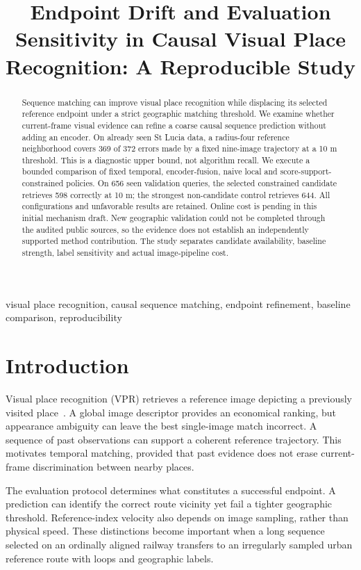 \documentclass[conference]{IEEEtran}
\title{Endpoint Drift and Evaluation Sensitivity in Causal Visual Place Recognition: A Reproducible Study}
\author{\IEEEauthorblockN{Mingyang Zhou}\IEEEauthorblockA{University of Chinese Academy of Sciences\\\textit{Additional authors and correspondence pending}}}
\begin{document}
\maketitle
\begin{abstract}
Sequence matching can improve visual place recognition while displacing its selected reference endpoint under a strict geographic matching threshold. We examine whether current-frame visual evidence can refine a coarse causal sequence prediction without adding an encoder. On already seen St Lucia data, a radius-four reference neighborhood covers 369 of 372 errors made by a fixed nine-image trajectory at a 10 m threshold. This is a diagnostic upper bound, not algorithm recall. We execute a bounded comparison of fixed temporal, encoder-fusion, naive local and score-support-constrained policies. On 656 seen validation queries, the selected constrained candidate retrieves 598 correctly at 10 m; the strongest non-candidate control retrieves 644. All configurations and unfavorable results are retained. Online cost is pending in this initial mechanism draft. New geographic validation could not be completed through the audited public sources, so the evidence does not establish an independently supported method contribution. The study separates candidate availability, baseline strength, label sensitivity and actual image-pipeline cost.
\end{abstract}
\begin{IEEEkeywords}visual place recognition, causal sequence matching, endpoint refinement, baseline comparison, reproducibility\end{IEEEkeywords}

\section{Introduction}
Visual place recognition (VPR) retrieves a reference image depicting a previously visited place~\cite{tutorial}. A global image descriptor provides an economical ranking, but appearance ambiguity can leave the best single-image match incorrect. A sequence of past observations can support a coherent reference trajectory. This motivates temporal matching, provided that past evidence does not erase current-frame discrimination between nearby places.

The evaluation protocol determines what constitutes a successful endpoint. A prediction can identify the correct route vicinity yet fail a tighter geographic threshold. Reference-index velocity also depends on image sampling, rather than physical speed. These distinctions become important when a long sequence selected on an ordinally aligned railway transfers to an irregularly sampled urban reference route with loops and geographic labels.
\end{document}
